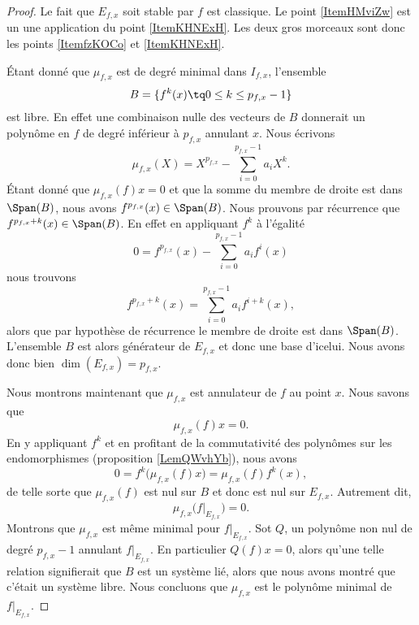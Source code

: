 \begin{proof}
    Le fait que \( E_{f,x}\) soit stable par \( f\) est classique. Le point \ref{ItemHMviZw} est un une application du point \ref{ItemKHNExH}. Les deux gros morceaux sont donc les points \ref{ItemfzKOCo} et \ref{ItemKHNExH}.

    Étant donné que \( \mu_{f,x}\) est de degré minimal dans \( I_{f,x}\), l'ensemble
    \begin{equation}
        B=\{ f^k(x)\tq 0\leq k\leq p_{f,x}-1 \}
    \end{equation}
    est libre. En effet une combinaison nulle des vecteurs de \( B\) donnerait un polynôme en \( f\) de degré inférieur à \( p_{f,x}\) annulant \( x\). Nous écrivons
    \begin{equation}
        \mu_{f,x}(X)=X^{p_{f,x}}-\sum_{i=0}^{p_{f,x}-1}a_iX^k. 
    \end{equation}
    Étant donné que \( \mu_{f,x}(f)x=0\) et que la somme du membre de droite est dans \( \Span(B)\), nous avons \( f^{p_{f,x}}(x)\in\Span(B)\). Nous prouvons par récurrence que \( f^{p_{f,x}+k}(x)\in\Span(B)\). En effet en appliquant \( f^k\) à l'égalité
    \begin{equation}
        0=f^{p_{f,x}}(x)-\sum_{i=0}^{p_{f,x}-1}a_if^i(x)
    \end{equation}
    nous trouvons
    \begin{equation}
        f^{p_{f,x}+k}(x)=\sum_{i=0}^{p_{f,x}-1}a_if^{i+k}(x),
    \end{equation}
    alors que par hypothèse de récurrence le membre de droite est dans \( \Span(B)\). L'ensemble \( B\) est alors générateur de \( E_{f,x}\) et donc une base d'icelui. Nous avons donc bien \( \dim(E_{f,x})=p_{f,x}\).

    Nous montrons maintenant que \( \mu_{f,x}\) est annulateur de \( f\) au point \( x\). Nous savons que
    \begin{equation}
        \mu_{f,x}(f)x=0.
    \end{equation}
    En y appliquant \( f^k\) et en profitant de la commutativité des polynômes sur les endomorphismes (proposition \ref{LemQWvhYb}), nous avons
    \begin{equation}
        0=f^k\big( \mu_{f,x}(f)x \big)=\mu_{f,x}(f)f^k(x),
    \end{equation}
    de telle sorte que \( \mu_{f,x}(f)\) est nul sur \( B\) et donc est nul sur \( E_{f,x}\). Autrement dit,
    \begin{equation}
        \mu_{f,x}\big( f|_{E_{f,x}} \big)=0.
    \end{equation}
    Montrons que \( \mu_{f,x}\) est même minimal pour \( f|_{E_{f,x}}\). Sot \( Q\), un polynôme non nul de degré \( p_{f,x}-1\) annulant \( f|_{E_{f,x}}\). En particulier \( Q(f)x=0\), alors qu'une telle relation signifierait que \( B\) est un système lié, alors que nous avons montré que c'était un système libre. Nous concluons que \( \mu_{f,x}\) est le polynôme minimal de \( f|_{E_{f,x}}\).
\end{proof}

